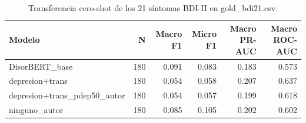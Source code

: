 \begin{table}[htbp]
\centering
\caption{Transferencia cero-shot de los 21 síntomas BDI-II en gold\_bdi21.csv.}
\label{tab:trisk_bdi21}
\begin{tabular}{lrrrrr}
\toprule
Modelo & N & Macro F1 & Micro F1 & Macro PR-AUC & Macro ROC-AUC \\
\midrule
DisorBERT\_base & 180 & 0.091 & 0.083 & 0.183 & 0.573 \\
depresion+trans & 180 & 0.054 & 0.058 & 0.207 & 0.637 \\
depresion+trans\_pdep50\_autor & 180 & 0.054 & 0.057 & 0.199 & 0.618 \\
ninguno\_autor & 180 & 0.085 & 0.105 & 0.202 & 0.602 \\
\bottomrule
\end{tabular}
\end{table}
